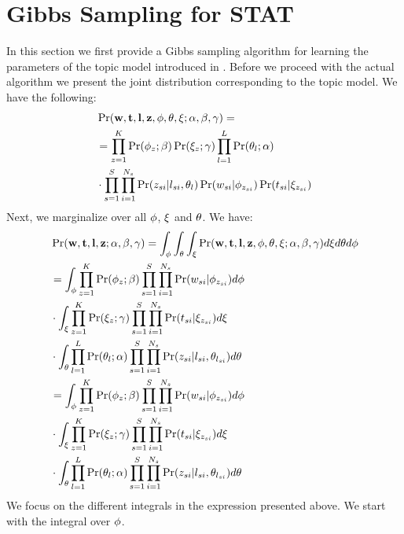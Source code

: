 \documentclass[twoside,leqno,twocolumn]{article}
\newcommand{\model}{{STAT}\xspace} %
\newcommand{\w}{{\bf w}}
\newcommand{\z}{{\bf z}}
\newcommand{\loc}{{\bf l}}
\newcommand{\tim}{{\bf t}}
\begin{document}
\section{Gibbs Sampling for \model}
\label{sec:gibbs}
In this section we first provide a Gibbs sampling algorithm for learning the parameters of the topic model introduced in . Before we proceed with the actual algorithm we present the joint distribution corresponding to the topic model. We have the following:
\begin{align}
&\Pr(\w,\tim,\loc,\z,{\bf \phi},{\bf \theta},{\bf \xi};\alpha,\beta,\gamma) =  \nonumber \\
&=\prod_{z = 1}^{K}\Pr(\phi_z;\beta)\Pr(\xi_z;\gamma) \prod_{l = 1}^{L}\Pr(\theta_l;\alpha) \nonumber \\
& \cdot \prod_{s = 1}^{S}\prod_{i = 1}^{N_s} \Pr(z_{si}|l_{si},\theta_l)\Pr(w_{si}|\phi_{z_{si}})\Pr(t_{si}|\xi_{z_{si}}) \nonumber
\end{align}
Next, we marginalize over all ${\bf \phi}$, ${\bf \xi}$ and ${\bf \theta}$. We have:
{\scriptsize
\begin{align}
&\Pr(\w,\tim,\loc,\z;\alpha,\beta,\gamma) =  \int_{\phi}\int_{\theta}\int_{\xi} \Pr(\w,\tim,\loc,\z,{\bf \phi},{\bf \theta},{\bf \xi};\alpha,\beta,\gamma) d\xi d\theta d\phi \nonumber \\
&=\int_{\phi} \prod_{z = 1}^{K}\Pr(\phi_z;\beta) \prod_{s = 1}^{S}\prod_{i = 1}^{N_s}\Pr(w_{si}|\phi_{z_{si}}) d\phi \nonumber \\
& \cdot \int_{\xi} \prod_{z = 1}^{K} \Pr(\xi_z;\gamma)\prod_{s = 1}^{S}\prod_{i = 1}^{N_s}\Pr(t_{si}|\xi_{z_{si}}) d\xi \nonumber \\
&\cdot \int_{\theta} \prod_{l = 1}^{L}\Pr(\theta_l;\alpha)\prod_{s = 1}^{S}\prod_{i = 1}^{N_s}\Pr(z_{si}|l_{si},\theta_{l_{si}})d\theta \nonumber \\
&=\int_{\phi} \prod_{z = 1}^{K}\Pr(\phi_z;\beta) \prod_{s = 1}^{S}\prod_{i = 1}^{N_s}\Pr(w_{si}|\phi_{z_{si}}) d\phi \nonumber \\
&  \cdot \int_{\xi} \prod_{z = 1}^{K} \Pr(\xi_z;\gamma)\prod_{s = 1}^{S}\prod_{i = 1}^{N_s}\Pr(t_{si}|\xi_{z_{si}}) d\xi \nonumber \\
&\cdot \int_{\theta} \prod_{l = 1}^{L}\Pr(\theta_l;\alpha)\prod_{s = 1}^{S}\prod_{i = 1}^{N_s}\Pr(z_{si}|l_{si},\theta_{l_{si}}) d\theta \nonumber
\end{align}
}
We focus on the different integrals in the expression presented above. We start with the integral over ${\bf \phi}$. 
\end{document}
